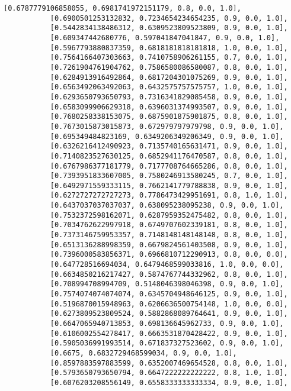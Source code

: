 \documentclass[11pt]{article}
\begin{document}
\begin{Verbatim}[commandchars=\\\{\}]
           [0.6787779106858055, 0.6981741972151179, 0.8, 0.0, 1.0],
           [0.6900501253132832, 0.7234654234654235, 0.9, 0.0, 1.0],
           [0.5442834138486312, 0.6309523809523809, 0.9, 0.0, 1.0],
           [0.609347442680776, 0.597041847041847, 0.9, 0.0, 1.0],
           [0.5967793880837359, 0.6818181818181818, 1.0, 0.0, 1.0],
           [0.7564166407303663, 0.7410758906261155, 0.7, 0.0, 1.0],
           [0.7261904761904762, 0.7586580086580087, 0.8, 0.0, 1.0],
           [0.6284913916492864, 0.6817204301075269, 0.9, 0.0, 1.0],
           [0.6563492063492063, 0.6432575757575757, 1.0, 0.0, 1.0],
           [0.6293650793650793, 0.7316341829085458, 0.9, 0.0, 1.0],
           [0.6583099906629318, 0.6396031374993507, 0.9, 0.0, 1.0],
           [0.7680258338153075, 0.6875901875901875, 0.8, 0.0, 1.0],
           [0.7673015873015873, 0.672979797979798, 0.9, 0.0, 1.0],
           [0.695349484823169, 0.6349206349206349, 0.9, 0.0, 1.0],
           [0.6326216412490923, 0.7135740165631471, 0.9, 0.0, 1.0],
           [0.7140823527630125, 0.6852941176470587, 0.8, 0.0, 1.0],
           [0.6767986377181779, 0.7177708764665286, 0.8, 0.0, 1.0],
           [0.7393951833607005, 0.7580246913580245, 0.7, 0.0, 1.0],
           [0.6492971559333115, 0.7662141779788838, 0.9, 0.0, 1.0],
           [0.6272727272727273, 0.7786473429951691, 0.8, 1.0, 1.0],
           [0.6437037037037037, 0.638095238095238, 0.9, 0.0, 1.0],
           [0.7532372598162071, 0.6287959352475482, 0.8, 0.0, 1.0],
           [0.7034762622997918, 0.6749707602339181, 0.8, 0.0, 1.0],
           [0.7373146759953357, 0.7148148148148148, 0.8, 0.0, 1.0],
           [0.6513136288998359, 0.6679824561403508, 0.9, 0.0, 1.0],
           [0.7396000583856371, 0.6966810712290913, 0.8, 0.0, 0.0],
           [0.647728516694034, 0.6479468599033816, 1.0, 0.0, 0.0],
           [0.6634850216217427, 0.5874767744332962, 0.8, 0.0, 1.0],
           [0.708994708994709, 0.5148046398046398, 0.9, 0.0, 1.0],
           [0.7574074074074074, 0.6345704948646125, 0.9, 0.0, 1.0],
           [0.5196870015948963, 0.6206636500754148, 1.0, 0.0, 0.0],
           [0.6273809523809524, 0.5882868089764641, 0.9, 0.0, 1.0],
           [0.6647065940713853, 0.698136645962733, 0.9, 0.0, 1.0],
           [0.6106002554278417, 0.6663531870428422, 0.9, 0.0, 1.0],
           [0.5905036991993514, 0.671837327523602, 0.9, 0.0, 1.0],
           [0.6675, 0.6832729468599034, 0.9, 0.0, 1.0],
           [0.8597883597883599, 0.6352007469654528, 0.8, 0.0, 1.0],
           [0.5793650793650794, 0.6647222222222222, 0.8, 1.0, 1.0],
           [0.6076203208556149, 0.6558333333333334, 0.9, 0.0, 1.0],

\end{Verbatim}
\end{document}
